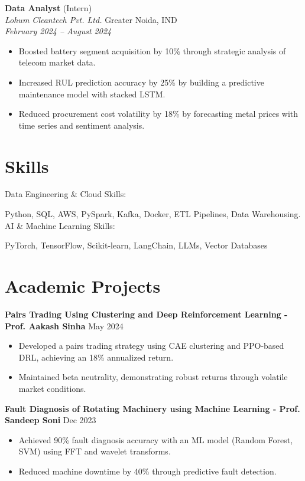 \documentclass[letterpaper,11pt]{article}
\begin{document}
\textbf{Data Analyst} (Intern) \\
\textit{Lohum Cleantech Pvt. Ltd.} \hfill Greater Noida, IND \\
\textit{February 2024 – August 2024}
\begin{itemize}[leftmargin=*, topsep=2pt, itemsep=-4pt]
    \item Boosted battery segment acquisition by 10\% through strategic analysis of telecom market data.
    \item Increased RUL prediction accuracy by 25\% by building a predictive maintenance model with stacked LSTM.
    \item Reduced procurement cost volatility by 18\% by forecasting metal prices with time series and sentiment analysis.
\end{itemize}

\section*{Skills}
Data Engineering & Cloud Skills:

Python, SQL, AWS, PySpark, Kafka, Docker, ETL Pipelines, Data Warehousing.
AI & Machine Learning Skills:

PyTorch, TensorFlow, Scikit-learn, LangChain, LLMs, Vector Databases

\section{Academic Projects}

\textbf{Pairs Trading Using Clustering and Deep Reinforcement Learning - Prof. Aakash Sinha} \hfill May 2024 \\
\begin{itemize}[leftmargin=*, topsep=0pt, itemsep=-4pt]
    \item Developed a pairs trading strategy using CAE clustering and PPO-based DRL, achieving an 18\% annualized return.
    \item Maintained beta neutrality, demonstrating robust returns through volatile market conditions.
\end{itemize}
\vspace{-0pt}

\textbf{Fault Diagnosis of Rotating Machinery using Machine Learning - Prof. Sandeep Soni} \hfill Dec 2023 \\
\begin{itemize}[leftmargin=*, topsep=0pt, itemsep=-4pt]
    \item Achieved 90\% fault diagnosis accuracy with an ML model (Random Forest, SVM) using FFT and wavelet transforms.
    \item Reduced machine downtime by 40\% through predictive fault detection.
\end{itemize}
\vspace{-0pt}
\end{document}
